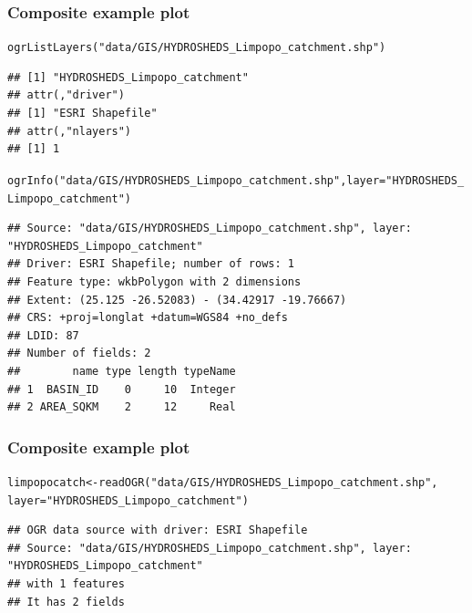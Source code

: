 \documentclass[xcolor=table, xcolor=dvipsnames]{beamer}\usepackage[]{graphicx}\usepackage[]{color}
\makeatletter
\newcommand{\hlstr}[1]{\textcolor[rgb]{0.545,0.137,0.137}{#1}}
\newcommand{\hlstd}[1]{\textcolor[rgb]{0,0,0}{#1}}
\newcommand{\hlkwb}[1]{\textcolor[rgb]{0,0,0}{#1}}
\newcommand{\hlkwc}[1]{\textcolor[rgb]{1,0,1}{#1}}
\newcommand{\hlkwd}[1]{\textcolor[rgb]{0,0,1}{#1}}
\newenvironment{kframe}{%
 \def\at@end@of@kframe{}%
 \ifinner\ifhmode%
  \def\at@end@of@kframe{\end{minipage}}%
  \begin{minipage}{\columnwidth}%
 \fi\fi%
 \def\FrameCommand##1{\hskip\@totalleftmargin \hskip-\fboxsep
 \colorbox{shadecolor}{##1}\hskip-\fboxsep
     \hskip-\linewidth \hskip-\@totalleftmargin \hskip\columnwidth}%
 \MakeFramed {\advance\hsize-\width
   \@totalleftmargin\z@ \linewidth\hsize
   \@setminipage}}%
 {\par\unskip\endMakeFramed%
 \at@end@of@kframe}
\newenvironment{knitrout}{}{} %
\makeatother
\begin{document}

\begin{frame}[fragile]\frametitle{Composite example plot}
\begin{knitrout}\tiny
{}\color{fgcolor}\begin{kframe}
\begin{alltt}
\hlkwd{ogrListLayers}\hlstd{(}\hlstr{"data/GIS/HYDROSHEDS_Limpopo_catchment.shp"}\hlstd{)}
\end{alltt}
\begin{verbatim}
## [1] "HYDROSHEDS_Limpopo_catchment"
## attr(,"driver")
## [1] "ESRI Shapefile"
## attr(,"nlayers")
## [1] 1
\end{verbatim}
\begin{alltt}
\hlkwd{ogrInfo}\hlstd{(}\hlstr{"data/GIS/HYDROSHEDS_Limpopo_catchment.shp"}\hlstd{,} \hlkwc{layer}\hlstd{=}\hlstr{"HYDROSHEDS_Limpopo_catchment"}\hlstd{)}
\end{alltt}
\begin{verbatim}
## Source: "data/GIS/HYDROSHEDS_Limpopo_catchment.shp", layer: "HYDROSHEDS_Limpopo_catchment"
## Driver: ESRI Shapefile; number of rows: 1 
## Feature type: wkbPolygon with 2 dimensions
## Extent: (25.125 -26.52083) - (34.42917 -19.76667)
## CRS: +proj=longlat +datum=WGS84 +no_defs  
## LDID: 87 
## Number of fields: 2 
##        name type length typeName
## 1  BASIN_ID    0     10  Integer
## 2 AREA_SQKM    2     12     Real
\end{verbatim}
\end{kframe}
\end{knitrout}
\end{frame}


\begin{frame}[fragile]\frametitle{Composite example plot}
\begin{knitrout}\tiny
{}\color{fgcolor}\begin{kframe}
\begin{alltt}
\hlstd{limpopocatch} \hlkwb{<-} \hlkwd{readOGR}\hlstd{(}\hlstr{"data/GIS/HYDROSHEDS_Limpopo_catchment.shp"}\hlstd{,}
                        \hlkwc{layer}\hlstd{=}\hlstr{"HYDROSHEDS_Limpopo_catchment"}\hlstd{)}
\end{alltt}
\begin{verbatim}
## OGR data source with driver: ESRI Shapefile 
## Source: "data/GIS/HYDROSHEDS_Limpopo_catchment.shp", layer: "HYDROSHEDS_Limpopo_catchment"
## with 1 features
## It has 2 fields
\end{verbatim}
\end{kframe}
\end{knitrout}
\end{frame}
\end{document}
